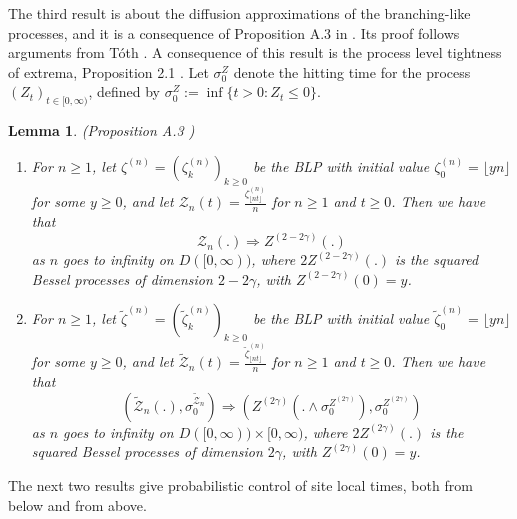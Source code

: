 \documentclass[twoside,12pt, a4paper]{article}
\newtheorem{lemma}{Lemma}[section]
\numberwithin{equation}{section}
\theoremstyle{remark}
\begin{document}
	The third result is about the diffusion approximations of the branching-like processes, and it is a consequence of Proposition A.3 in \cite{KMP23}. Its proof follows arguments from T\'{o}th \cite{T96}. A consequence of this result is the process level tightness of extrema, Proposition 2.1 \cite{KMP23}. 
	Let $\sigma_0^Z$ denote the hitting time for the process $\left( Z_t \right) _{t \in [0,\infty )}$, defined by $\sigma_0^Z := \inf \{t>0: Z_t \le 0\} $.
	\begin{lemma}(Proposition A.3 \cite{KMP23})\label{lm: diffusion approximation of blp}
		\begin{enumerate}
			\item 
			For $n\geq 1$, let $\zeta^{(n)}=(\zeta^{(n)}_k)_{k\geq 0 }  $ be the BLP with initial value $\zeta^{(n)}_0 = \lfloor yn \rfloor$ for some $y \geq 0$, and let $\mathcal{Z}_n(t) = \frac{\zeta^{(n)}_{\lfloor nt \rfloor}}{n}$ for $n\geq 1$ and $t\geq 0$. Then we have that 
			\[
			\mathcal{Z}_n(.) \Longrightarrow Z^{(2-2\gamma)}(.)
			\] 
			as $n$ goes to infinity on $D([0,\infty))$, where $2Z^{(2-2\gamma)}(.)$ is the squared Bessel processes of dimension $2-2\gamma$, with $Z^{(2 - 2 \gamma)}(0) = y$.
			
			\item
			For $n\geq 1$, let $\tilde\zeta^{(n)}=(\tilde\zeta^{(n)}_k)_{k\geq 0 }  $ be the BLP with initial value $\tilde\zeta^{(n)}_0 = \lfloor yn \rfloor$ for some $y \geq 0$, and let $\tilde{\mathcal{Z}}_n(t) = \frac{\tilde\zeta^{(n)}_{\lfloor nt \rfloor}}{n}$ for $n\geq 1$ and $t\geq 0$. Then we have that 
			\[
			\left(\tilde{\mathcal{Z}}_n(.), \sigma_0^{\tilde{\mathcal{Z}}_n}\right) 
			\Longrightarrow \left(Z^{(2\gamma)}(. \wedge \sigma_0^{Z^{(2 \gamma)}}), \sigma_0^{Z^{(2 \gamma)}}\right)
			\]
			as $n$ goes to infinity on $D([0,\infty)) \times [0,\infty )$, where $2Z^{(2\gamma)}(.)$ is the squared Bessel processes of dimension $2\gamma$, with $Z^{( 2 \gamma)}(0) = y$.
		\end{enumerate}
		
		
	\end{lemma}
	
	
	The next two results give probabilistic control of site local times, both from below and from above.
	
\end{document}
